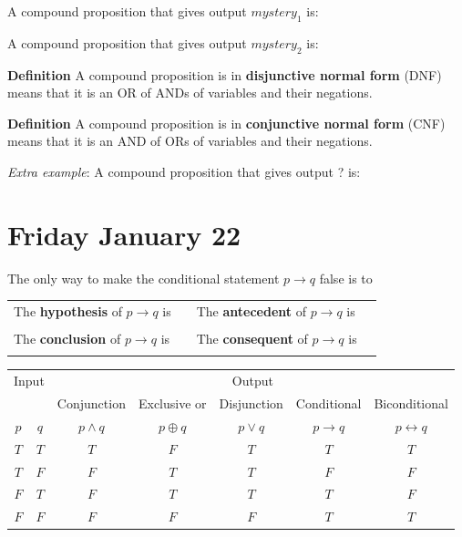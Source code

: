 \documentclass[12pt, oneside]{article}
\begin{document}
A compound proposition that  gives output $mystery_1$ is: \underline{\phantom{\hspace{3in}}}


\vfill


A compound proposition that  gives output $mystery_2$ is: \underline{\phantom{\hspace{3in}}}


\vfill



{\bf  Definition} A compound proposition is in {\bf disjunctive normal form}  (DNF) means
that  it is an OR of ANDs of variables and their negations.

{\bf  Definition} A compound proposition is in {\bf conjunctive normal form}  (CNF) means
that  it is an AND of ORs of variables and their negations.


{\it Extra example}: A compound proposition that  gives output ? is: 


\vfill
\vfill

\newpage
\section*{Friday January 22}

The only way to make  the conditional statement $p \to q$ false is to \underline{\phantom{\hspace{3in}}}


\begin{tabular}{llll}
The {\bf  hypothesis}  of $p \to q$ is  &\underline{\phantom{\hspace{1in}}} &
The {\bf  antecedent}  of $p \to q$ is  &\underline{\phantom{\hspace{1in}}} \\
&&&  \\
The {\bf  conclusion}  of $p \to q$ is & \underline{\phantom{\hspace{1in}}}&
The {\bf  consequent}  of $p \to q$ is & \underline{\phantom{\hspace{1in}}}\\
&&&  \\
\end{tabular}

\vfill

\begin{center}
\begin{tabular}{cc||c|c|c|c|c}
\multicolumn{2}{c||}{Input}  & \multicolumn{5}{c}{Output} \\
 & & Conjunction &  Exclusive or & Disjunction  &  Conditional & Biconditional  \\
$p$ & $q$ & $p \wedge q$ &  $p  \oplus  q$ & $p \vee  q$ & $p \to q$ & $p \leftrightarrow q$\\
\hline
$T$ & $T$ & $T$ & $F$ & $T$ & $T$& $T$\\
$T$ & $F$ & $F$ & $T$ & $T$ & $F$& $F$\\
$F$ & $T$ & $F$ & $T$ & $T$ & $T$& $F$\\
$F$ & $F$ & $F$ & $F$ & $F$ & $T$& $T$\\
\end{tabular}
\end{center}
\end{document}
